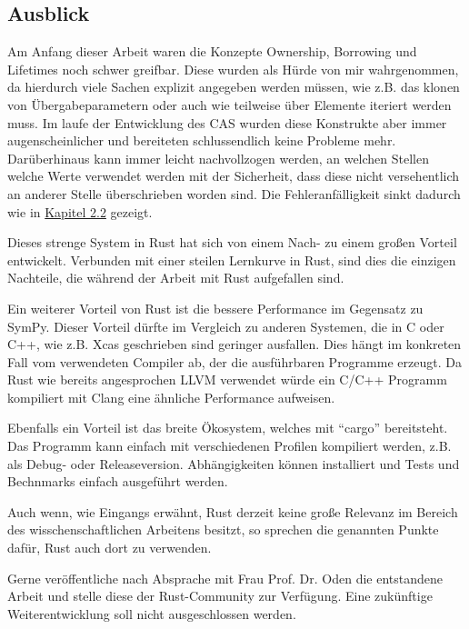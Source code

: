 \documentclass[11pt,a4paper, ngerman]{article}
\begin{document}
\subsection{Ausblick}
Am Anfang dieser Arbeit waren die Konzepte Ownership, Borrowing und Lifetimes noch schwer greifbar. Diese wurden als Hürde von mir wahrgenommen, da hierdurch viele Sachen explizit angegeben werden müssen, wie z.B. das klonen von Übergabeparametern oder auch wie teilweise über Elemente iteriert werden muss. Im laufe der Entwicklung des CAS wurden diese Konstrukte aber immer augenscheinlicher und bereiteten schlussendlich keine Probleme mehr. Darüberhinaus kann immer leicht nachvollzogen werden, an welchen Stellen welche Werte verwendet werden mit der Sicherheit, dass diese nicht versehentlich an anderer Stelle überschrieben worden sind. Die Fehleranfälligkeit sinkt dadurch wie in \hyperref[sec:kap2d2]{Kapitel 2.2} gezeigt.

Dieses strenge System in Rust hat sich von einem Nach- zu einem großen Vorteil entwickelt. Verbunden mit einer steilen Lernkurve in Rust, sind dies die einzigen Nachteile, die während der Arbeit mit Rust aufgefallen sind.

Ein weiterer Vorteil von Rust ist die bessere Performance im Gegensatz zu SymPy. Dieser Vorteil dürfte im Vergleich zu anderen Systemen, die in C oder C++, wie z.B. Xcas \cite{XcasLink} geschrieben sind geringer ausfallen. Dies hängt im konkreten Fall vom verwendeten Compiler ab, der die ausführbaren Programme erzeugt. Da Rust wie bereits angesprochen LLVM verwendet würde ein C/C++ Programm kompiliert mit Clang eine ähnliche Performance aufweisen.

Ebenfalls ein Vorteil ist das breite Ökosystem, welches mit ``cargo'' bereitsteht. Das Programm kann einfach mit verschiedenen Profilen kompiliert werden, z.B. als Debug- oder Releaseversion. Abhängigkeiten können installiert und Tests und Bechnmarks einfach ausgeführt werden.

Auch wenn, wie Eingangs erwähnt, Rust derzeit keine große Relevanz im Bereich des wisschenschaftlichen Arbeitens besitzt, so sprechen die genannten Punkte dafür, Rust auch dort zu verwenden.

Gerne veröffentliche nach Absprache mit Frau Prof. Dr. Oden die entstandene Arbeit und stelle diese der Rust-Community zur Verfügung. Eine zukünftige Weiterentwicklung soll nicht ausgeschlossen werden.

\newpage

\raggedright

\end{document}
